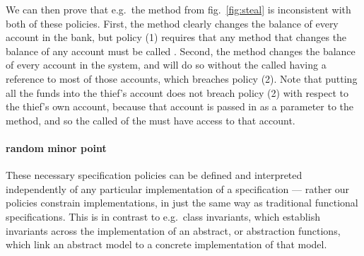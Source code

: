 We can then prove that e.g.\ the  method from
fig.~\ref{fig:steal} is inconsistent with both of these policies.
First, the  method clearly changes the balance of
every account in the bank, but policy (1) requires that any method
that changes the balance of any account must be called .
Second, the  method changes the balance of every account in
the system, and will do so without the called having a reference to
most of those accounts, which breaches policy (2).   Note
that  putting all the funds into the thief's account
does not breach policy (2) with respect to the thief's own account,
because that account is passed in as a parameter to the 
method, and so the called of the  must have access to that
account.


\paragraph{random minor point}

These necessary specification policies
can be defined and interpreted independently of any particular
implementation of a specification --- rather our policies constrain
implementations, in just the same way as traditional functional
specifications.  This is in contrast to e.g.\ class invariants, which
establish invariants across the implementation of an abstract, or
abstraction functions, which link an abstract model to a concrete
implementation of that model. 
